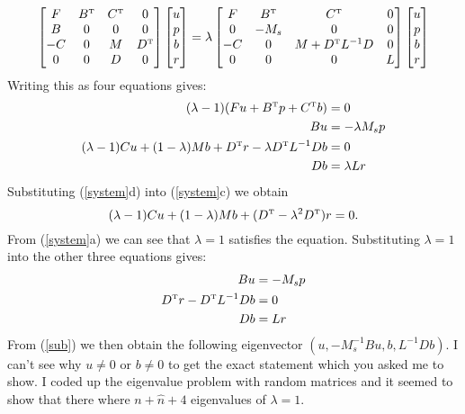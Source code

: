 \documentclass[11pt]{article}
\newcommand{\Bt}{\ensuremath{B^{\mbox{\tiny{T}}}}}
\newcommand{\Ct}{\ensuremath{C^{\mbox{\tiny{T}}}}}
\newcommand{\Dt}{\ensuremath{D^{\mbox{\tiny{T}}}}}
\begin{document}
$$
\begin{bmatrix}
F & \Bt & \Ct & 0 \\
B & 0 & 0 & 0 \\
-C & 0 & M & \Dt  \\
0 & 0 & D &0
\end{bmatrix}
\begin{bmatrix}
u \\ p \\ b \\ r
\end{bmatrix}
= \lambda
\begin{bmatrix}
F & \Bt & \Ct & 0 \\
0 & -M_s & 0 & 0 \\
-C & 0 & M+\Dt L^{-1} D & 0  \\
0 & 0 & 0 &L
\end{bmatrix}
\begin{bmatrix}
u \\ p \\ b \\ r
\end{bmatrix}
$$
Writing this as four equations gives:
\begin{subequations} \label{system}
    \begin{align}
        (\lambda -1) (Fu+\Bt p+ \Ct b) &= 0\\
        B u &= -\lambda M_s p\\
        (\lambda - 1)C u +(1-\lambda)Mb +\Dt r -\lambda \Dt L^{-1} D b &=0\\
        Db &= \lambda Lr
    \end{align}
\end{subequations}
Substituting (\ref{system}d) into (\ref{system}c) we obtain
\begin{equation} \label{sub}
(\lambda - 1)C u +(1-\lambda)Mb + (\Dt -\lambda^2 \Dt)r =0.
\end{equation}
From (\ref{system}a) we can see that $\lambda = 1$ satisfies the equation. Substituting $\lambda = 1$ into the other three equations gives:
\begin{subequations}
    \begin{align}
        B u &= - M_s p\\
         \Dt r - \Dt L^{-1} D b &=0\\
        Db &=  Lr
    \end{align}
\end{subequations}
From (\ref{sub}) we then obtain the following eigenvector $(u, -M_s^{-1}Bu,b,L^{-1}Db)$. I can't see why $u\neq0$ or $b \neq0$ to get the exact statement which you asked me to show. I coded up the eigenvalue problem with random matrices and it seemed to show that there where $n+\hat{n}+4$ eigenvalues of $\lambda = 1$.
\end{document}
